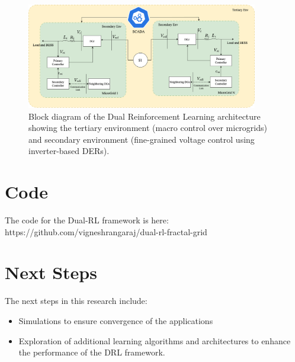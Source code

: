 \documentclass{article}
\begin{document}
\begin{figure}[h!]
    \centering
    \includegraphics[width=0.9\textwidth]{dual_rl.png}
    \caption{Block diagram of the Dual Reinforcement Learning architecture showing the tertiary environment (macro control over microgrids) and secondary environment (fine-grained voltage control using inverter-based DERs).}
    \label{fig:dual_rl_architecture}
\end{figure}

\section{Code}
The code for the Dual-RL framework is here: https://github.com/vigneshrangaraj/dual-rl-fractal-grid

\section{Next Steps}
The next steps in this research include:
\begin{itemize}
    \item Simulations to ensure convergence of the applications
    \item Exploration of additional learning algorithms and architectures to enhance the performance of the DRL framework.
\end{itemize}
\end{document}

